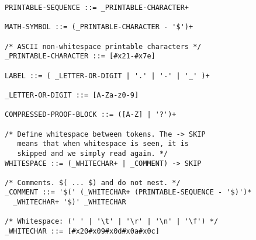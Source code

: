 \begin{verbatim}
PRINTABLE-SEQUENCE ::= _PRINTABLE-CHARACTER+

MATH-SYMBOL ::= (_PRINTABLE-CHARACTER - '$')+

/* ASCII non-whitespace printable characters */
_PRINTABLE-CHARACTER ::= [#x21-#x7e]

LABEL ::= ( _LETTER-OR-DIGIT | '.' | '-' | '_' )+

_LETTER-OR-DIGIT ::= [A-Za-z0-9]

COMPRESSED-PROOF-BLOCK ::= ([A-Z] | '?')+

/* Define whitespace between tokens. The -> SKIP
   means that when whitespace is seen, it is
   skipped and we simply read again. */
WHITESPACE ::= (_WHITECHAR+ | _COMMENT) -> SKIP

/* Comments. $( ... $) and do not nest. */
_COMMENT ::= '$(' (_WHITECHAR+ (PRINTABLE-SEQUENCE - '$)')*
  _WHITECHAR+ '$)' _WHITECHAR

/* Whitespace: (' ' | '\t' | '\r' | '\n' | '\f') */
_WHITECHAR ::= [#x20#x09#x0d#x0a#x0c]
\end{verbatim}
%
%
%
%
%
%
\cleardoublepage
{}  %


%

\raggedright
\cleardoublepage
{} %




